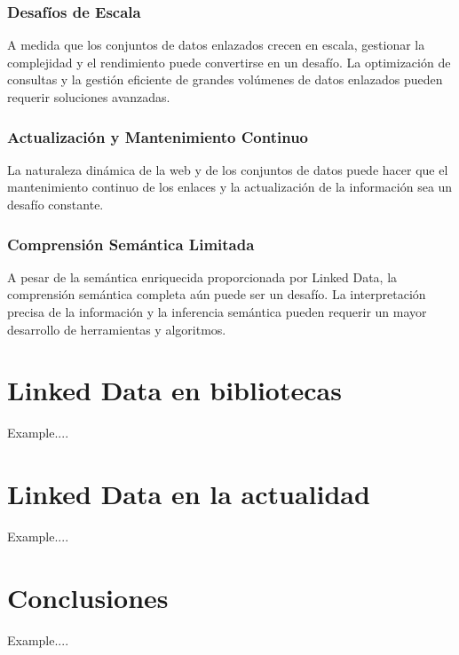 \documentclass[11pt]{report}
\begin{document}
\subsection*{Desafíos de Escala}

		A medida que los conjuntos de datos enlazados crecen en escala, gestionar la complejidad y el rendimiento puede convertirse en un desafío. La optimización de consultas y la gestión eficiente de grandes volúmenes de datos enlazados pueden requerir soluciones avanzadas.
\subsection*{Actualización y Mantenimiento Continuo}

		La naturaleza dinámica de la web y de los conjuntos de datos puede hacer que el mantenimiento continuo de los enlaces y la actualización de la información sea un desafío constante.
\subsection*{Comprensión Semántica Limitada}

		A pesar de la semántica enriquecida proporcionada por Linked Data, la comprensión semántica completa aún puede ser un desafío. La interpretación precisa de la información y la inferencia semántica pueden requerir un mayor desarrollo de herramientas y algoritmos.

\chapter{Linked Data en bibliotecas}
Example....

\chapter{Linked Data en la actualidad}
Example....

\chapter{Conclusiones}
Example....
\end{document}

